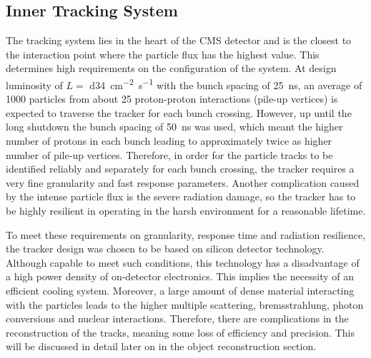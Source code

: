 \subsection{Inner Tracking System}
The tracking system lies in the heart of the CMS detector and is the closest to the interaction point where the particle
flux has the highest value. This determines high requirements on the configuration of the system. At design luminosity
of $L = $ \SI{d34}{\cm^{-2} s^{-1}} with the bunch spacing of \SI{25}{\ns}, an average of \num{1000} particles from about
\num{25} proton-proton interactions (pile-up vertices) is expected to traverse the tracker for each bunch crossing.
However, up until the long shutdown the bunch spacing of \SI{50}{\ns} was used, which meant the higher number of protons
in each bunch leading to approximately twice as higher number of pile-up vertices. Therefore, in order for the particle
tracks to be identified reliably and separately for each bunch crossing, the tracker requires a very fine granularity
and fast response parameters. Another complication caused by the intense particle flux is the severe radiation damage,
so the tracker has to be highly resilient in operating in the harsh environment for a reasonable lifetime.

To meet these requirements on granularity, response time and radiation resilience, the tracker design was chosen to be
based on silicon detector technology. Although capable to meet such conditions, this technology has a disadvantage of a
high power density of on-detector electronics. This implies the necessity of an efficient cooling system. Moreover, a
large amount of dense material interacting with the particles leads to the higher multiple scattering, bremsstrahlung,
photon conversions and nuclear interactions. Therefore, there are complications in the reconstruction of the tracks,
meaning some loss of efficiency and precision. This will be discussed in detail later on in the object reconstruction
section.

